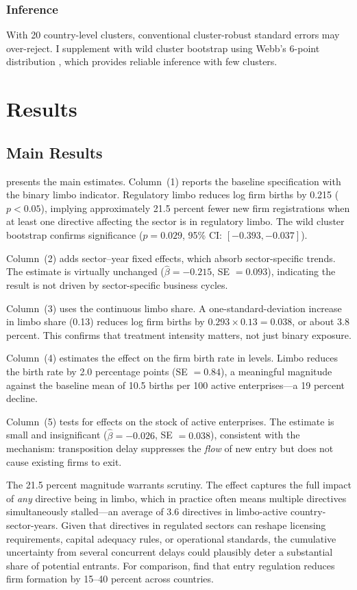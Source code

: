 \documentclass[12pt]{article}
\begin{document}
\subsubsection*{Inference} With 20 country-level clusters, conventional cluster-robust standard errors may over-reject. I supplement with wild cluster bootstrap using Webb's 6-point distribution \citep{cameron2008, webb2013}, which provides reliable inference with few clusters.


\section{Results}
\label{sec:results}

\subsection{Main Results}

 presents the main estimates. Column~(1) reports the baseline specification with the binary limbo indicator. Regulatory limbo reduces log firm births by 0.215 ($p < 0.05$), implying approximately 21.5 percent fewer new firm registrations when at least one directive affecting the sector is in regulatory limbo. The wild cluster bootstrap confirms significance ($p = 0.029$, 95\% CI: $[-0.393, -0.037]$).

Column~(2) adds sector--year fixed effects, which absorb sector-specific trends. The estimate is virtually unchanged ($\hat{\beta} = -0.215$, SE $= 0.093$), indicating the result is not driven by sector-specific business cycles.

Column~(3) uses the continuous limbo share. A one-standard-deviation increase in limbo share (0.13) reduces log firm births by $0.293 \times 0.13 = 0.038$, or about 3.8 percent. This confirms that treatment intensity matters, not just binary exposure.

Column~(4) estimates the effect on the firm birth rate in levels. Limbo reduces the birth rate by 2.0 percentage points (SE $= 0.84$), a meaningful magnitude against the baseline mean of 10.5 births per 100 active enterprises---a 19 percent decline.

Column~(5) tests for effects on the stock of active enterprises. The estimate is small and insignificant ($\hat{\beta} = -0.026$, SE $= 0.038$), consistent with the mechanism: transposition delay suppresses the \textit{flow} of new entry but does not cause existing firms to exit.

The 21.5 percent magnitude warrants scrutiny. The effect captures the full impact of \textit{any} directive being in limbo, which in practice often means multiple directives simultaneously stalled---an average of 3.6 directives in limbo-active country-sector-years. Given that directives in regulated sectors can reshape licensing requirements, capital adequacy rules, or operational standards, the cumulative uncertainty from several concurrent delays could plausibly deter a substantial share of potential entrants. For comparison, \citet{klapper2006} find that entry regulation reduces firm formation by 15--40 percent across countries.
\end{document}

